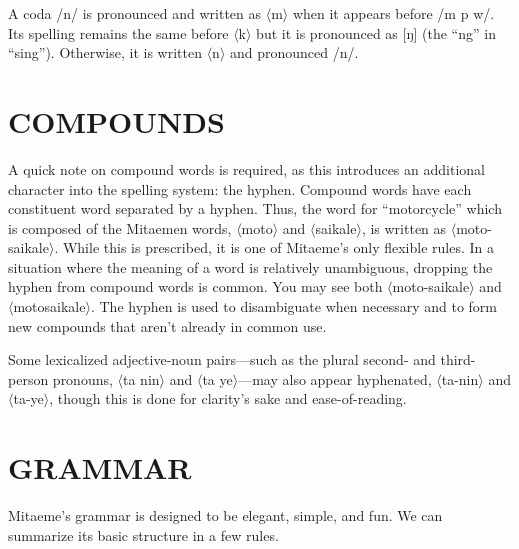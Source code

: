 \documentclass[a4paper, titlepage]{article}
\begin{document}
A coda /n/ is pronounced and written as $\langle$m$\rangle$ when it appears before /m p w/. Its spelling remains the same before $\langle$k$\rangle$ but it is pronounced as [ŋ] (the ``ng'' in ``sing''). Otherwise, it is written $\langle$n$\rangle$ and pronounced /n/.

\section{COMPOUNDS}

A quick note on compound words is required, as this introduces an additional character into the spelling system: the hyphen. Compound words have each constituent word separated by a hyphen. Thus, the word for ``motorcycle'' which is composed of the Mitaemen words, $\langle$moto$\rangle$  and $\langle$saikale$\rangle$, is written as $\langle$moto-saikale$\rangle$. While this is prescribed, it is one of Mitaeme's only flexible rules. In a situation where the meaning of a word is relatively unambiguous, dropping the hyphen from compound words is common. You may see both $\langle$moto-saikale$\rangle$ and $\langle$motosaikale$\rangle$. The hyphen is used to disambiguate when necessary and to form new compounds that aren't already in common use.

Some lexicalized adjective-noun pairs—such as the plural second- and third-person pronouns, $\langle$ta nin$\rangle$ and $\langle$ta ye$\rangle$—may also appear hyphenated,  $\langle$ta-nin$\rangle$ and $\langle$ta-ye$\rangle$, though this is done for clarity's sake and ease-of-reading.

\section{GRAMMAR}

Mitaeme's grammar is designed to be elegant,  simple, and fun. We can summarize its basic structure in a few rules.
\end{document}
